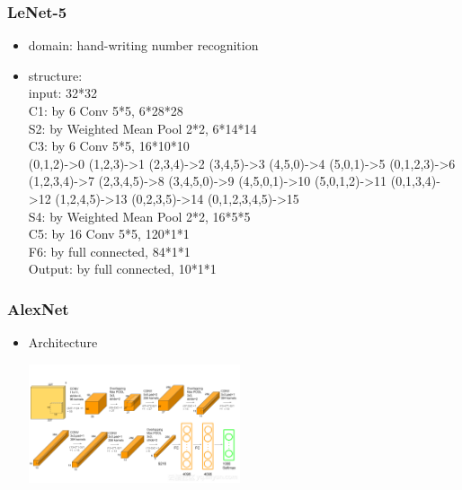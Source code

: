 \begin{frame}
\frametitle{LeNet-5}
	\small
	\begin{itemize}
		\item domain: hand-writing number recognition
		\item structure:
		\\\hspace{0.5cm}input: 32*32
		\\\hspace{0.5cm}C1: by 6 Conv 5*5, 6*28*28
		\\\hspace{0.5cm}S2: by Weighted Mean Pool 2*2, 6*14*14
		\\\hspace{0.5cm}C3: by 6 Conv 5*5, 16*10*10
		\\(0,1,2)->0
		(1,2,3)->1
		(2,3,4)->2
		(3,4,5)->3
		(4,5,0)->4
		(5,0,1)->5
		(0,1,2,3)->6
		(1,2,3,4)->7
		(2,3,4,5)->8
		(3,4,5,0)->9
		(4,5,0,1)->10
		(5,0,1,2)->11
		(0,1,3,4)->12
		(1,2,4,5)->13
		(0,2,3,5)->14
		(0,1,2,3,4,5)->15
		\\\hspace{0.5cm}S4: by Weighted Mean Pool 2*2, 16*5*5
		\\\hspace{0.5cm}C5: by 16 Conv 5*5, 120*1*1
		\\\hspace{0.5cm}F6: by full connected, 84*1*1
		\\\hspace{0.5cm}Output: by full connected, 10*1*1
	\end{itemize}
\end{frame}
\begin{frame}
\frametitle{AlexNet}
	\small
	\begin{itemize}
		\item Architecture
			\centerline{\includegraphics[height=3.5cm]{AlexNet.png}}
	\end{itemize}
\end{frame}

